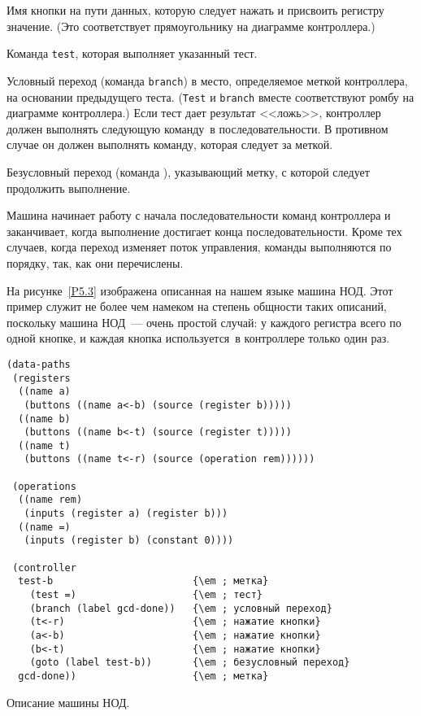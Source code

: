 \begin{plainlist}


\item
Имя кнопки на пути данных, которую следует нажать и
присвоить регистру значение. (Это соответствует прямоугольнику на
диаграмме контроллера.)

\item
Команда {\tt test}, 
которая выполняет указанный тест.

\item
Условный переход (команда {\tt branch}) 
в место, определяемое
меткой контроллера, на основании предыдущего
теста. ({\tt Test} и {\tt branch} вместе соответствуют
ромбу на диаграмме контроллера.)  Если тест дает результат <<ложь>>, контроллер должен
выполнять следующую команду~в последовательности. В противном случае
он должен выполнять команду, которая следует за меткой.

\item
Безусловный переход (команда  ),
указывающий метку, с которой следует продолжить выполнение.
\end{plainlist}
Машина начинает работу с начала последовательности команд контроллера
и заканчивает, когда выполнение достигает конца последовательности.
Кроме тех случаев, когда переход изменяет поток управления, команды
выполняются по порядку, так, как они перечислены.

На рисунке~\ref{P5.3} изображена описанная на
нашем языке машина НОД.  Этот пример служит не более чем намеком на степень
общности таких описаний, поскольку машина НОД~--- очень простой
случай: у каждого регистра всего по одной кнопке, и каждая кнопка
используется~в контроллере только один раз.

\begin{cntrfig}
{\small 
\begin{Verbatim}[fontsize=\small]
(data-paths
 (registers
  ((name a)
   (buttons ((name a<-b) (source (register b)))))
  ((name b)
   (buttons ((name b<-t) (source (register t)))))
  ((name t)
   (buttons ((name t<-r) (source (operation rem))))))

 (operations
  ((name rem)
   (inputs (register a) (register b)))
  ((name =)
   (inputs (register b) (constant 0))))

 (controller
  test-b                        {\em ; метка}
    (test =)                    {\em ; тест}
    (branch (label gcd-done))   {\em ; условный переход}
    (t<-r)                      {\em ; нажатие кнопки}
    (a<-b)                      {\em ; нажатие кнопки}
    (b<-t)                      {\em ; нажатие кнопки}
    (goto (label test-b))       {\em ; безусловный переход}
  gcd-done))                    {\em ; метка}
\end{Verbatim}
}\caption{Описание машины НОД.}
\label{P5.3}

\end{cntrfig}

